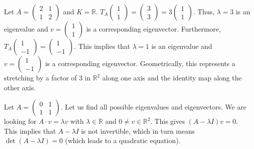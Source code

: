\begin{example}\label{ex:eigenvalue_R2_stretch}
  Let $A = \left(\begin{smallmatrix} 2 & 1 \\ 1 & 2 \end{smallmatrix}\right)$ and $K = \mathbb{R}$.
  $T_A \left(\begin{smallmatrix} 1 \\ 1 \end{smallmatrix}\right) = \left(\begin{smallmatrix} 3 \\ 3 \end{smallmatrix}\right) = 3 \left(\begin{smallmatrix} 1 \\ 1 \end{smallmatrix}\right)$. Thus, $\lambda = 3$ is an eigenvalue and $v = \left(\begin{smallmatrix} 1 \\ 1 \end{smallmatrix}\right)$ is a corresponding eigenvector.
  Furthermore, $T_A \left(\begin{smallmatrix} 1 \\ -1 \end{smallmatrix}\right) = \left(\begin{smallmatrix} 1 \\ -1 \end{smallmatrix}\right)$. This implies that $\lambda = 1$ is an eigenvalue and $v = \left(\begin{smallmatrix} 1 \\ -1 \end{smallmatrix}\right)$ is a corresponding eigenvector.
  Geometrically, this represents a stretching by a factor of 3 in $\mathbb{R}^2$ along one axis and the identity map along the other axis.
\end{example}

\begin{example}\label{ex:eigenvalue_R2_quadratic}
  Let $A = \left(\begin{smallmatrix} 0 & 1 \\ 1 & 1 \end{smallmatrix}\right)$. Let us find all possible eigenvalues and eigenvectors.
  We are looking for $A \cdot v = \lambda v$ with $\lambda \in \mathbb{R}$ and $0 \ne v \in \mathbb{R}^2$.
  This gives $(A - \lambda I)v = 0$. This implies that $A - \lambda I$ is not invertible, which in turn means $\det(A - \lambda I) = 0$ (which leads to a quadratic equation).
\end{example}


